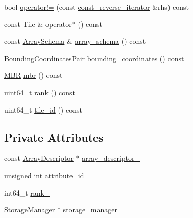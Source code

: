 \begin{DoxyCompactItemize}
\item 
bool \hyperlink{classStorageManager_1_1const__reverse__iterator_a0b21be39b691c5bea220281bc24486c7}{operator!=} (const \hyperlink{classStorageManager_1_1const__reverse__iterator}{const\+\_\+reverse\+\_\+iterator} \&rhs) const 
\item 
const \hyperlink{classTile}{Tile} \& \hyperlink{classStorageManager_1_1const__reverse__iterator_a342ab47865f32b1632b1f174549051a7}{operator$\ast$} () const 
\item 
const \hyperlink{classArraySchema}{Array\+Schema} \& \hyperlink{classStorageManager_1_1const__reverse__iterator_a314bf0375f7cfaebc4e8256fcab31737}{array\+\_\+schema} () const 
\item 
\hyperlink{classStorageManager_ac8560870eda78bbbf5a864b05767d186}{Bounding\+Coordinates\+Pair} \hyperlink{classStorageManager_1_1const__reverse__iterator_ab76a396934ee5c19fd076bbf9a416a27}{bounding\+\_\+coordinates} () const 
\item 
\hyperlink{classStorageManager_aae5e268ee02c08fc12dd74661b43da75}{M\+B\+R} \hyperlink{classStorageManager_1_1const__reverse__iterator_aaa55ec24a15819845d39ad098808283e}{mbr} () const 
\item 
uint64\+\_\+t \hyperlink{classStorageManager_1_1const__reverse__iterator_a594d641b4827b839a323c14206699f9a}{rank} () const 
\item 
uint64\+\_\+t \hyperlink{classStorageManager_1_1const__reverse__iterator_a9e536584e021b23737e434f0ff0117f8}{tile\+\_\+id} () const 
\end{DoxyCompactItemize}
\subsection*{Private Attributes}
\begin{DoxyCompactItemize}
\item 
const \hyperlink{classStorageManager_1_1ArrayDescriptor}{Array\+Descriptor} $\ast$ \hyperlink{classStorageManager_1_1const__reverse__iterator_adde48f0889f85b007891043843ae3820}{array\+\_\+descriptor\+\_\+}
\item 
unsigned int \hyperlink{classStorageManager_1_1const__reverse__iterator_a8b0c9eac681ef6f9ec62a9ce9f7a0884}{attribute\+\_\+id\+\_\+}
\item 
int64\+\_\+t \hyperlink{classStorageManager_1_1const__reverse__iterator_a7906ebe8820eb933528e446bc445c622}{rank\+\_\+}
\item 
\hyperlink{classStorageManager}{Storage\+Manager} $\ast$ \hyperlink{classStorageManager_1_1const__reverse__iterator_aef007cafd4083f3ec852a2debc3b411b}{storage\+\_\+manager\+\_\+}
\end{DoxyCompactItemize}


